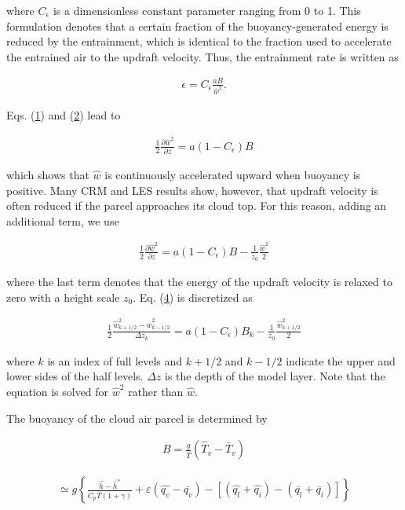 where \(C_\epsilon\) is a dimensionless constant parameter ranging from
0 to 1. This formulation denotes that a certain fraction of the
buoyancy-generated energy is reduced by the entrainment, which is
identical to the fraction used to accelerate the entrained air to the
updraft velocity. Thus, the entrainment rate is written as

\begin{eqnarray}
 \epsilon = C_\epsilon\frac{aB}{\hat{w}^2}. \label{p-cum.2}
\end{eqnarray}

Eqs. (\href{p-cum.1}{1}) and (\href{p-cum.2}{2}) lead to

\begin{eqnarray}
 \frac{1}{2}\frac{\partial \hat{w}^2}{\partial z} = a(1 - C_\epsilon) B
\end{eqnarray}

which shows that \(\hat{w}\) is continuously accelerated upward when
buoyancy is positive. Many CRM and LES results show, however, that
updraft velocity is often reduced if the parcel approaches its cloud
top. For this reason, adding an additional term, we use

\begin{eqnarray}
 \frac{1}{2}\frac{\partial \hat{w}^2}{\partial z} = a(1 - C_\epsilon) B - \frac{1}{z_0}\frac{\hat{w}^2}{2}\label{p-cum.4}
\end{eqnarray}

where the last term denotes that the energy of the updraft velocity is
relaxed to zero with a height scale \(z_0\). Eq. (\href{p-cum.4}{4}) is
discretized as

\begin{eqnarray}
 \frac{1}{2}\frac{\hat{w}^2_{k+1/2} - \hat{w}^2_{k-1/2}}{\Delta z_k} = a(1 - C_\epsilon) B_k - \frac{1}{z_0}\frac{\hat{w}_{k+1/2}^2}{2} \label{p-cum.A5}
\end{eqnarray}

where \(k\) is an index of full levels and \(k+1/2\) and \(k-1/2\)
indicate the upper and lower sides of the half levels. \(\Delta z\) is
the depth of the model layer. Note that the equation is solved for
\(\hat{w}^2\) rather than \(\hat{w}\).

The buoyancy of the cloud air parcel is determined by

\begin{eqnarray}
 B  =   \frac{g}{\bar{T}} ( \hat{T}_v - \bar{T}_v )
\end{eqnarray}

\begin{eqnarray}
 \simeq g \left\{ \frac{\hat{h} - \bar{h}^*}{C_p \bar{T}(1 + \gamma)} + \varepsilon(\hat{q_v}-\bar{q_v}) - \left[ (\hat{q_l}+\hat{q_i}) - (\bar{q_l}+\bar{q_i}) \right] \right\}
\end{eqnarray}

